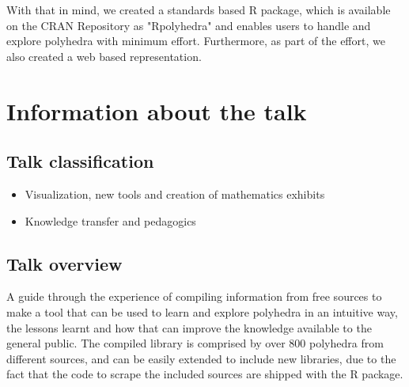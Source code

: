 \documentclass[a4paper,10pt]{article}
\begin{document}
With that in mind, we created a standards based R package, which is available on the CRAN Repository as "Rpolyhedra" and enables users to handle and explore polyhedra with minimum effort. Furthermore, as part of the effort, we also created a web based representation\cite{RPOLY_EXPLORER}.
     

\section{Information about the talk}

\subsection{Talk classification}

\begin{itemize}
\item Visualization, new tools and creation of mathematics exhibits
\item Knowledge transfer and pedagogics 
\end{itemize}

\subsection{Talk overview}

A guide through the experience of compiling information from free sources to make a tool that can be used to learn and explore polyhedra in an intuitive way, the lessons learnt and how that can improve the knowledge available to the general public. The compiled library is comprised by over 800 polyhedra from different sources, and can be easily extended to include new libraries, due to the fact that the code to scrape the included sources are shipped with the R package. 
\end{document}
